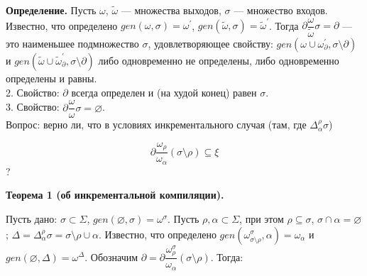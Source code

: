 





\hrulefill

\textbf{Определение.} Пусть $\omega$, $\tilde{\omega}$ --- множества выходов, $\sigma$ --- множество входов. Известно, что определено $gen(\omega, \sigma) = \omega^\prime$, $gen(\tilde{\omega}, \sigma) = \tilde{\omega}^\prime$. Тогда $\partial\dfrac{\omega}{\tilde{\omega}}\sigma = \partial$ --- это наименьшее подмножество $\sigma$, удовлетворяющее свойству: 
$gen(\omega \cup \omega^\prime_{\partial}, \sigma\setminus\partial)$ и
$gen(\tilde{\omega} \cup \tilde{\omega}^\prime_{\partial}, \sigma\setminus\partial)$ либо одновременно не определены, либо одновременно определены и равны. 
\\

2. Свойство: $\partial$ всегда определен и (на худой конец) равен $\sigma$.
\\

3. Свойство: $\partial\dfrac{\omega}{\omega}\sigma = \varnothing$.
\\

Вопрос: верно ли, что в условиях инкрементального случая (там, где $\Delta^\rho_\alpha\sigma$)

$$\partial\dfrac{\omega_\rho}{\omega_\alpha}(\sigma\setminus\rho)\subseteq\xi$$ ?

\begin{comment}
	\textbf{Доказательство:}

	\newcommand{\mypart}{\partial\dfrac{\omega_\rho}{\omega_\alpha}(\sigma\setminus\rho)}

	Докажем, что если $s \in \sigma\setminus\rho$, $s \notin \xi$, то $s \notin \mypart$. Обозначим $\tau = (\sigma\setminus\rho)\setminus\mypart$, тогда $\tau$ --- наибольшее подмножество $\sigma\setminus\rho$, такое, что $gen(\omega_\rho, \tau)$ определено $\Leftrightarrow$ $gen(\omega_\alpha, \tau)$ определено. Предположим, $s \in \mypart$, тогда $s \notin \tau$. Рассмотрим $gen(\omega_\rho, \tau)$.
\end{comment}

\newpage

\newcommand{\butpartial}{\sigma\setminus\rho\setminus\partial}

\textbf{Теорема 1 (об инкрементальной компиляции).}

Пусть дано: $\sigma \subset \Sigma$, $gen(\varnothing, \sigma) = \omega^\sigma$. Пусть $\rho, \alpha \subset \Sigma$, при этом $\rho \subseteq \sigma$, $\sigma \cap \alpha = \varnothing$; $\Delta = \Delta^\rho_\alpha\sigma = \sigma\setminus\rho\cup\alpha$. Известно, что определено $gen(\omega^\sigma_{\sigma\setminus\rho}, \alpha) = \omega_\alpha$ и $gen(\varnothing, \Delta) = \omega^\Delta$. Обозначим $\partial = \partial\dfrac{\omega^\sigma_\rho}{\omega_\alpha}(\sigma\setminus\rho)$.
Тогда:

